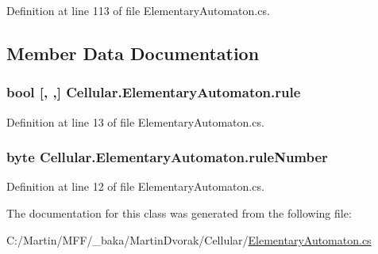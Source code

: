 Definition at line 113 of file Elementary\+Automaton.\+cs.



\subsection{Member Data Documentation}
\hypertarget{class_cellular_1_1_elementary_automaton_a7de75f196155059435ac9098aa6b2a52}{}
\subsubsection[{rule}]{\setlength{\rightskip}{0pt plus 5cm}bool \mbox{[}, ,\mbox{]} Cellular.\+Elementary\+Automaton.\+rule\hspace{0.3cm}{\ttfamily [protected]}}\label{class_cellular_1_1_elementary_automaton_a7de75f196155059435ac9098aa6b2a52}


Definition at line 13 of file Elementary\+Automaton.\+cs.

\hypertarget{class_cellular_1_1_elementary_automaton_aa9221b2c09faebf1dd67ba75194b15f8}{}
\subsubsection[{rule\+Number}]{\setlength{\rightskip}{0pt plus 5cm}byte Cellular.\+Elementary\+Automaton.\+rule\+Number\hspace{0.3cm}{\ttfamily [protected]}}\label{class_cellular_1_1_elementary_automaton_aa9221b2c09faebf1dd67ba75194b15f8}


Definition at line 12 of file Elementary\+Automaton.\+cs.



The documentation for this class was generated from the following file\+:\begin{DoxyCompactItemize}
\item 
C\+:/\+Martin/\+M\+F\+F/\+\_\+baka/\+Martin\+Dvorak/\+Cellular/\hyperlink{_elementary_automaton_8cs}{Elementary\+Automaton.\+cs}\end{DoxyCompactItemize}

